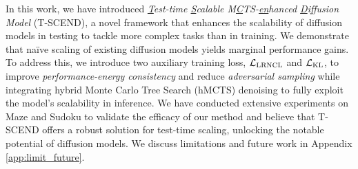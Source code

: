 
In this work, we have introduced \emph{\underline{T}est-time \underline{S}calable M\underline{C}TS-\underline{en}hanced \underline{D}iffusion Model} (T-SCEND), a novel framework that enhances the scalability of diffusion models in testing to tackle more complex tasks than in training. We demonstrate that na\"ive scaling of existing diffusion models yields marginal performance gains. To address this, we introduce two auxiliary training loss, ${\mathcal{L}}_\text{LRNCL}$ and ${\mathcal{L}}_\text{KL}$, to improve \emph{performance-energy consistency} and reduce \emph{adversarial sampling} while integrating hybrid Monte Carlo Tree Search (hMCTS) denoising to fully exploit the model's scalability in inference. We have conducted extensive experiments on Maze and Sudoku to validate the efficacy of our method and believe that T-SCEND offers a robust solution for test-time scaling, unlocking the notable potential of diffusion models. We discuss limitations and future work in Appendix \ref{app:limit_future}.